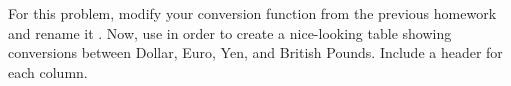 {For this problem, modify your conversion function from the previous homework and rename it .  Now, use  in order to create a nice-looking table showing conversions between Dollar, Euro, Yen, and British Pounds.  Include a header for each column.}
{}
